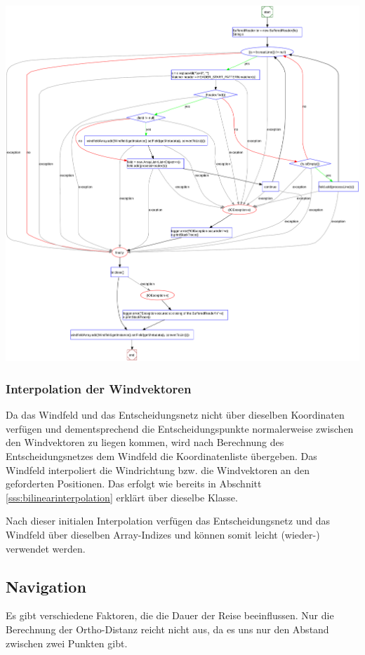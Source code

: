 \begin{center}
 \includegraphics[width=0.8\linewidth]{img/ControlFlowGraph-SpaceWindFieldLoader-read}
\end{center}



\subsubsection{Interpolation der Windvektoren}
Da das Windfeld und das Entscheidungsnetz nicht über dieselben Koordinaten
verfügen und dementsprechend die Entscheidungspunkte normalerweise zwischen den
Windvektoren zu liegen kommen, wird nach Berechnung des Entscheidungsnetzes dem
Windfeld die Koordinatenliste übergeben. Das Windfeld interpoliert die
Windrichtung bzw. die Windvektoren an den geforderten Positionen. Das erfolgt
wie bereits in Abschnitt \ref{sss:bilinearinterpolation} erklärt über dieselbe
Klasse.

Nach dieser initialen Interpolation verfügen das Entscheidungsnetz und das
Windfeld über dieselben Array-Indizes und können somit leicht (wieder-)
verwendet werden.

\subsection{Navigation}
Es gibt verschiedene Faktoren, die die Dauer der Reise beeinflussen. Nur die
Berechnung der Ortho-Distanz reicht nicht aus, da es uns nur den Abstand
zwischen zwei Punkten gibt.

